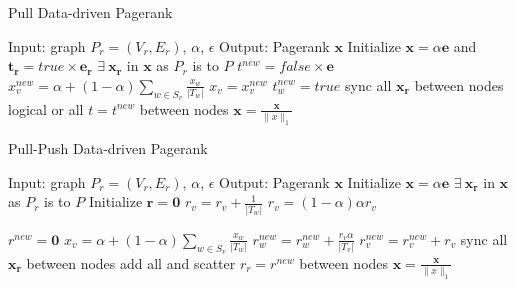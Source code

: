 \documentclass[letterpaper,12pt,onecolumn]{article}
\begin{document}
\begin{algorithm}
\caption{Pull Data-driven Pagerank}
\label{alg:pull}
\begin{algorithmic}[1]
  \STATE Input: graph $P_{r} = (V_r, E_r)$, $\alpha$, $\epsilon$
  \STATE Output: Pagerank $\mathbf{x}$
  \STATE Initialize $\mathbf{x} = \alpha \mathbf{e}$ and $\mathbf{t_r} = true \times \mathbf{e_r}$
  \STATE $\exists  \medspace \mathbf{x_r}$ in $\mathbf{x}$ as $P_r$ is to $P$
	\STATE $t^{new} = false \times \mathbf{e}$
			\STATE $x_{v}^{new} = \alpha + (1 - \alpha) \sum_{w \in S_v} \frac{x_{w}}{|T_w|} $
				\STATE $x_v = x_v^{new}$
					\STATE $t_w^{new} = true$
				\ENDFOR
			\ENDIF
		\ENDIF
	\ENDFOR
	\STATE sync all $\mathbf{x_r}$ between nodes
	\STATE logical or all $t = t^{new}$ between nodes
  \ENDWHILE
  \STATE $\mathbf{x} = \frac{\mathbf{x} }{\|x\|_{1}}$
\end{algorithmic}
\end{algorithm}

\begin{algorithm}
\caption{Pull-Push Data-driven Pagerank}
\label{alg:pullpush}
\begin{algorithmic}[1]
  \STATE Input: graph $P_{r} = (V_r, E_r)$, $\alpha$, $\epsilon$
  \STATE Output: Pagerank $\mathbf{x}$
  \STATE Initialize $\mathbf{x} = \alpha \mathbf{e}$
  \STATE $\exists  \medspace \mathbf{x_r}$ in $\mathbf{x}$ as $P_r$ is to $P$
  \STATE Initialize $\mathbf{r} = \mathbf{0}$
		\STATE $r_v = r_v + \frac{1}{|T_w|}$
	\ENDFOR
	\STATE $r_v = (1 - \alpha)\alpha r_v$
  \ENDFOR

	\STATE $r^{new} = \mathbf{0}$
			\STATE $x_{v} = \alpha + (1 - \alpha) \sum_{w \in S_v} \frac{x_{w}}{|T_w|} $
				\STATE $r_w^{new} = r_w^{new} + \frac{r_v \alpha}{|T_v|}$
			\ENDFOR
		\ELSE
			\STATE $r_v^{new} = r_v^{new} + r_v$
		\ENDIF
	\ENDFOR
	\STATE sync all $\mathbf{x_r}$ between nodes
	\STATE add all and scatter $ r_r = r^{new}$ between nodes
  \ENDWHILE
  \STATE $\mathbf{x} = \frac{\mathbf{x} }{\|x\|_{1}}$
\end{algorithmic}
\end{algorithm}
\end{document}
